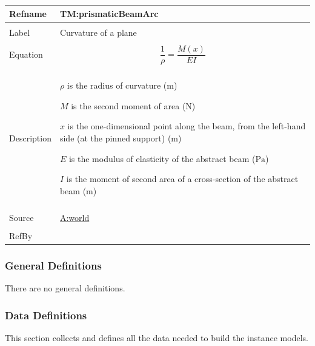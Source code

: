 \documentclass[12pt]{article}
\begin{document}
\begin{minipage}{\textwidth}
\begin{tabular}{>{\raggedright}p{}>{\raggedright\arraybackslash}p{}}
\toprule \textbf{Refname} & \textbf{TM:prismaticBeamArc}
\label{TM:prismaticBeamArc}
\\ \midrule \\
Label & Curvature of a plane
        
\\ \midrule \\
Equation & \begin{displaymath}
           \frac{1}{ρ}=\frac{M\left(x\right)}{E I}
           \end{displaymath}
\\ \midrule \\
Description & \begin{symbDescription}
              \item{$ρ$ is the radius of curvature (${\text{m}}$)}
              \item{$M$ is the second moment of area (${\text{N}}$)}
              \item{$x$ is the one-dimensional point along the beam, from the left-hand side (at the pinned support) (${\text{m}}$)}
              \item{$E$ is the modulus of elasticity of the abstract beam (${\text{Pa}}$)}
              \item{$I$ is the moment of second area of a cross-section of the abstract beam (${\text{m}}$)}
              \end{symbDescription}
\\ \midrule \\
Source & \hyperref[world]{A:world}
         
\\ \midrule \\
RefBy & 
\\ \bottomrule
\end{tabular}
\end{minipage}
\subsubsection{General Definitions}
\label{Sec:GDs}
There are no general definitions.

\subsubsection{Data Definitions}
\label{Sec:DDs}
This section collects and defines all the data needed to build the instance models.
\end{document}
